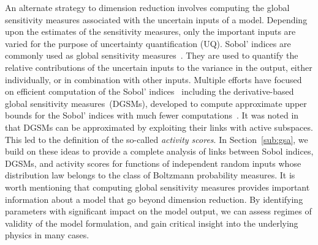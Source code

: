 An alternate strategy to dimension reduction involves computing the global
sensitivity measures associated with the uncertain inputs of a model. Depending
upon the estimates of the sensitivity measures, only the important inputs are
varied for the purpose of uncertainty quantification (UQ). Sobol' indices are
commonly used as global sensitivity measures~\cite{Sobol:2001}. They are
used to quantify the relative contributions of the uncertain inputs to the variance
in the output, either individually, or in combination with other inputs. 
Multiple efforts have focused on efficient computation of the Sobol' 
indices~\cite{Sudret:2008,Plischke:2013,Tissot:2015,Li:2016} including the 
derivative-based global sensitivity measures~(DGSMs), developed to
compute approximate upper bounds for the Sobol' indices with much fewer
computations~\cite{Sobol:2009, Lamboni:2013}. It was noted
in~\cite{Diaz:2016,Constantine:2017} that DGSMs can be approximated by
exploiting their links with active subspaces. This led to the definition of the 
so-called \emph{activity scores}. In Section~\ref{sub:gsa}, we build on these
ideas to provide a complete analysis of links between Sobol indices, DGSMs, and
activity scores for functions of independent random inputs whose distribution
law belongs to the class of Boltzmann probability measures. 
It is worth mentioning that computing global sensitivity measures provides 
important information about a model that go beyond dimension reduction. By 
identifying parameters with significant impact on the model output, we can assess
regimes of validity of the model formulation, and gain critical insight into the
underlying physics in many cases. 
 

